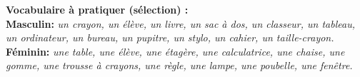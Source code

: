 \documentclass[11pt]{article}
\begin{document}
\vspace{6pt}
\noindent\textbf{Vocabulaire à pratiquer (sélection) :}\\
\noindent \textbf{Masculin:} \textit{un crayon, un élève, un livre, un sac à dos, un classeur, un tableau, un ordinateur, un bureau, un pupitre, un stylo, un cahier, un taille-crayon.}\\
\noindent \textbf{Féminin:} \textit{une table, une élève, une étagère, une calculatrice, une chaise, une gomme, une trousse à crayons, une règle, une lampe, une poubelle, une fenêtre.}
\end{document}
